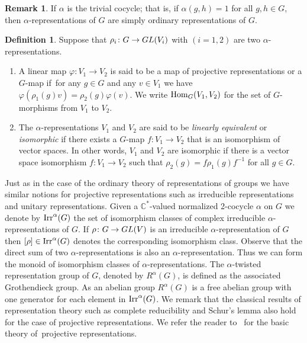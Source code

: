 \documentclass[11pt]{article}
\numberwithin{equation}{section}
\def\C{\mathbb{C}}
\DeclareMathOperator{\Hom}{\textup{Hom}}
\DeclareMathOperator{\Irr}{\textup{Irr}}
\theoremstyle{definition}
\newtheorem{Def}[Th]{Definition}
\newtheorem{Rem}[Th]{Remark}
\numberwithin{equation}{section}
\begin{document}
\begin{Rem}
If $\alpha$ is the trivial cocycle; that is, if $\alpha(g,h)=1$ for all $g,h\in G$, then
$\alpha$-representations of $G$ are simply ordinary representations of $G$.
\end{Rem}

\begin{Def}
Suppose that $\rho_{i}\colon G\rightarrow {\rm GL}(V_{i})$ with $(i=1,2)$ are two $\alpha$-representations.
\begin{enumerate}\itemsep=0pt
\item A linear map $\varphi\colon V_{1}\to V_{2}$ is said to be a map of projective representations or a
$G$-map if~for any $g\in G$ and any $v\in V_{1}$ we have $\varphi(\rho_{1}(g)v)=\rho_{2}(g)\varphi(v)$.
We write $\Hom_{G}(V_{1},V_{2})$ for the set of $G$-morphisms from $V_{1}$ to $V_{2}$.

\item The $\alpha$-representations $V_{1}$ and $V_{2}$
are said to be \textit{linearly equivalent} or \textit{isomorphic} if
there exists a $G$-map $f\colon V_{1}\to V_{2}$ that is an isomorphism of vector spaces.
In other words, $V_{1}$ and $V_{2}$ are isomorphic if there is a vector space
isomorphism $f\colon V_{1}\rightarrow V_{2}$ such that $\rho_{2}(g)=f\rho_{1}(g)f^{-1}$ for all $g\in G$.
\end{enumerate}
\end{Def}

Just as in the case of the ordinary theory of representations of groups
we have similar notions for projective representations such as irreducible representations
and unitary representations. Given a $\C^{\ast}$-valued normalized 2-cocycle $\alpha$ on
$G$ we denote by $\Irr^{\alpha}(G)$ the set of isomorphism classes of
complex irreducible $\alpha$-representations of $G$.
If $\rho\colon G\to {\rm GL}(V)$ is an irreducible $\alpha$-representation of $G$ then $[\rho]\in \Irr^{\alpha}(G)$
denotes the corresponding isomorphism class. Observe that the direct sum of two $\alpha$-representations
is also an $\alpha$-representation. Thus we can form the monoid of isomorphism classes of $\alpha$-representations.
The $\alpha$-twisted representation group of $G$, denoted by $R^{\alpha}(G)$,
is defined as the associated Grothendieck group. As an abelian group $R^{\alpha}(G)$ is a free abelian
group with one generator for each element in $\Irr^{\alpha}(G)$.
We remark that the classical results of representation theory
such as complete reducibility and Schur's lemma also hold for the case of projective representations.
We refer the reader to~\cite{Karpilovsky2} for
the basic theory of~projective representations.
\end{document}
